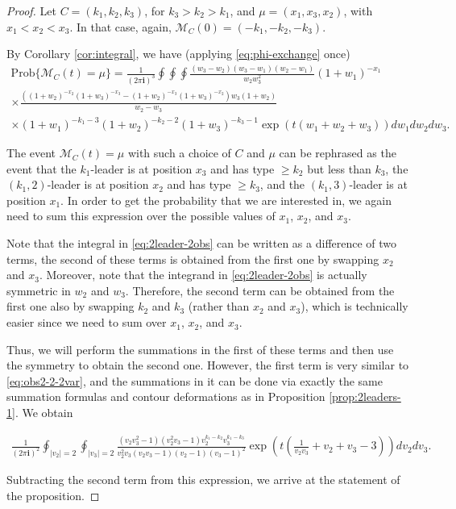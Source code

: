 \documentclass[11pt,reqno]{amsart}
\theoremstyle{definition}
\theoremstyle{remark}
\theoremstyle{remark}
\def\geq{\geqslant}
\renewcommand\ge{\geq}
\def\M{\mathcal M}
\newcommand{\ii}{{\mathbf i}}
\numberwithin{equation}{section}
\begin{document}
	\begin{proof}
		Let $C=(k_1, k_2,k_3)$, for $k_3>k_2>k_1$, and $\mu = (x_1,x_3,x_2)$, with $x_1<x_2<x_3$. In that case, again, $\M_C(0)= (-k_1, -k_2,-k_3)$. 
		
		By Corollary \ref{cor:integral}, we have (applying \eqref{eq:phi-exchange} once)
		\begin{multline}
			\label{eq:2leader-2obs}
			\mathrm{Prob}\{\M_C(t)=\mu\} =
			\frac{1}{(2 \pi \ii)^3} \oint \oint \oint \frac{(w_3-w_2)(w_3-w_1)(w_2-w_1)}{w_2 w_3^2} (1+w_1)^{-x_1} \\ \times \frac{\left( (1+w_2)^{-x_2} (1+w_3)^{-x_3} - (1+w_2)^{-x_3} (1+w_3)^{-x_2} \right) w_3 (1+w_2)}{w_2-w_3} \\ \times (1+w_1)^{-k_1-3} (1+w_2)^{-k_2-2} (1+w_3)^{-k_3-1} \exp \left( t(w_1+w_2+w_3) \right) d w_1 dw_2 dw_3.
		\end{multline}
		
		The event $\M_C(t)=\mu$ with such a choice of $C$ and $\mu$ can be rephrased as the event that the $k_1$-leader is at position $x_3$ and has type $\ge k_2$ but less than $k_3$, the $(k_1,2)$-leader is at position $x_2$ and has type $\ge k_3$, and the $(k_1,3)$-leader is at position $x_1$.
		In order to get the probability that we are interested in, we again need to sum this expression over the possible values of $x_1$, $x_2$, and $x_3$.
		
		Note that the integral in \eqref{eq:2leader-2obs} can be written as a difference of two terms, the second of these terms is obtained from the first one by swapping $x_2$ and $x_3$. Moreover, note that the integrand in \eqref{eq:2leader-2obs} is actually symmetric in $w_2$ and $w_3$. Therefore, the second term can be obtained from the first one also by swapping $k_2$ and $k_3$ (rather than $x_2$ and $x_3$), which is technically easier since we need to sum over $x_1$, $x_2$, and $x_3$. 
		
		Thus, we will perform the summations in the first of these terms and then use the symmetry to obtain the second one. However, the first term is very similar to \eqref{eq:obs2-2-2var}, and the summations in it can be done via exactly the same summation formulas and contour deformations as in Proposition \ref{prop:2leaders-1}. We obtain  
		
		\begin{multline*}
			\frac{1}{(2 \pi \ii)^2} \oint_{|v_2|=2} \oint_{|v_3|=2} \frac{(v_2 v_3^2-1)(v_2^2 v_3-1) v_2^{k_1-k_2} v_3^{k_1-k_3}}{ v_2^2 v_3 (v_2 v_3-1) (v_2-1) (v_3-1)^2 }  \exp \left( t \left( \frac{1}{v_2 v_3} + v_2 + v_3 - 3 \right) \right) d v_2 d v_3.
		\end{multline*}
		
		Subtracting the second term from this expression, we arrive at the statement of the proposition. 
		
	\end{proof}
	
\end{document}
